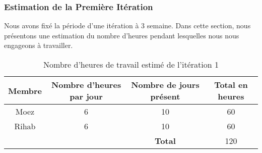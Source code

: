 \subsubsection{Estimation de la Première Itération}

Nous avons fixé la période d'une itération à 3 semaine. Dans cette section,
nous présentons une estimation du nombre d'heures pendant lesquelles nous nous
engageons à travailler.

\begin{table}[htbp]
    \centering
    \begin{tabular}{| c | c | c | c |}
        \hline
        \textbf{Membre} & \textbf{Nombre d'heures par jour} & \textbf{Nombre de jours présent} & \textbf{Total en heures} \\ \hline
        \hline

Moez & 6 & 10 & 60\\ \hline
Rihab & 6 & 10 & 60 \\ \hline
\multicolumn{2}{c|}{} & \textbf{Total} & 120 \\ \cline{3-4}
    \end{tabular}
    \caption{Nombre d'heures de travail estimé de l'itération 1}
    \label{tab:sprint1-capacity}
\end{table}

